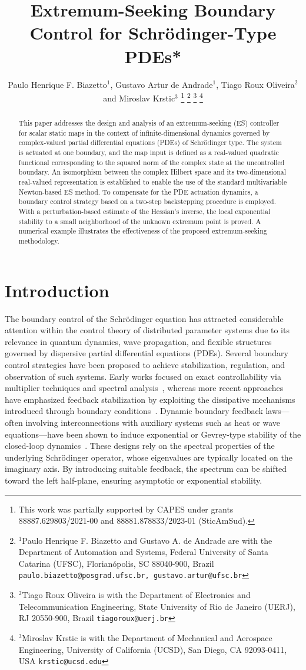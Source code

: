 \documentclass[letterpaper, 10 pt, conference]{ieeeconf}  %
\title{\LARGE \bf
Extremum-Seeking Boundary Control for Schrödinger-Type PDEs*
}
\author{Paulo Henrique F. Biazetto$^{1}$, Gustavo Artur de Andrade$^{1}$, Tiago Roux Oliveira$^{2}$ and Miroslav Krstic$^{3}$%
\thanks{This work was partially supported by CAPES under grants 88887.629803/2021-00  and 88881.878833/2023-01 (SticAmSud).}%
\thanks{$^{1}$Paulo Henrique F. Biazetto and Gustavo A. de Andrade
are with the Department of Automation and Systems, Federal University of Santa Catarina (UFSC), Florianópolis, SC 88040-900, Brazil {\tt\small paulo.biazetto@posgrad.ufsc.br, gustavo.artur@ufsc.br}}%
\thanks{$^{2}$Tiago Roux Oliveira is with the Department of Electronics and Telecommunication Engineering, State University of Rio de Janeiro (UERJ), RJ 20550-900, Brazil {\tt\small tiagoroux@uerj.br}}%
\thanks{$^{3}$Miroslav Krstic is with the Department of Mechanical and Aerospace Engineering, University of California (UCSD), San Diego, CA 92093-0411, USA {\tt\small krstic@ucsd.edu}}
}
\begin{document}
\maketitle
\thispagestyle{empty}
\pagestyle{empty}


\begin{abstract}

This paper addresses the design and analysis of an extremum-seeking (ES) controller for scalar static maps in the context of infinite-dimensional dynamics governed by complex-valued partial differential equations (PDEs) of Schrödinger type. The system is actuated at one boundary, and the map input is defined as a real-valued quadratic functional corresponding to the squared norm of the complex state at the uncontrolled boundary. An isomorphism between the complex Hilbert space and its two-dimensional real-valued representation is established to enable the use of the standard multivariable Newton-based ES method. To compensate for the PDE actuation dynamics, a boundary control strategy based on a two-step backstepping procedure is employed. With a perturbation-based estimate of the Hessian’s inverse, the local exponential stability to a small neighborhood of the unknown extremum point is proved. A numerical example illustrates the effectiveness of the proposed extremum-seeking methodology.
\end{abstract}

\section{Introduction}

The boundary control of the Schrödinger equation has attracted considerable attention within the control theory of distributed parameter systems due to its relevance in quantum dynamics, wave propagation, and flexible structures governed by dispersive partial differential equations (PDEs). Several boundary control strategies have been proposed to achieve stabilization, regulation, and observation of such systems. Early works focused on exact controllability via multiplier techniques and spectral analysis~\cite{phung2001}, whereas more recent approaches have emphasized feedback stabilization by exploiting the dissipative mechanisms introduced through boundary conditions~\cite{steeves2020,Ren2013,Bhandari2024}. Dynamic boundary feedback laws—often involving interconnections with auxiliary systems such as heat or wave equations—have been shown to induce exponential or Gevrey-type stability of the closed-loop dynamics~\cite{Wang2012}. These designs rely on the spectral properties of the underlying Schrödinger operator, whose eigenvalues are typically located on the imaginary axis. By introducing suitable feedback, the spectrum can be shifted toward the left half-plane, ensuring asymptotic or exponential stability.
\end{document}

